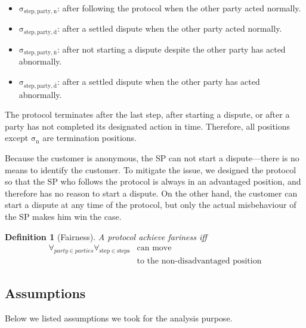 \documentclass{ieeeaccess}
\newtheorem{definition}{Definition}
\begin{document}
\begin{itemize}

\item
  $\mathrm{\sigma_{step,party,n}}$: after following the protocol when the other party acted normally.
\item
  $\mathrm{\sigma_{step,party,d}}$: after a settled dispute when the other party acted normally.
\item
  $\mathrm{\sigma_{step,party,\overline{n}}}$: after not starting a dispute despite the other party has acted abnormally.
\item
  $\mathrm{\sigma_{step,party,\overline{d}}}$: after a settled dispute when the other party has acted abnormally.
\end{itemize}



The protocol terminates after the last step, after starting a dispute, or after a party has not completed its designated action in time. Therefore, all positions except $\mathrm{\sigma_n}$ are termination positions.

Because the customer is anonymous, the SP can not start a dispute—there is no means to identify the customer. To mitigate the issue, we designed the protocol so that the SP who follows the protocol is always in an advantaged position, and therefore has no reason to start a dispute. On the other hand, the customer can start a dispute at any time of the protocol, but only the actual misbehaviour of the SP makes him win the case.

\begin{definition}[Fairness] \label{def:fairness}
A protocol achieve fariness iff 
\begin{equation*}
\begin{split}
\forall_{party \in parties}\forall_{\mathrm{step} \in \mathrm{steps}} &\operatorname{can\ move}\\
&\operatorname{to\ the\ non-disadvantaged\ position} 
\end{split}
\end{equation*}

\end{definition}


\subsection{Assumptions}\label{sec:assumptions}

Below we listed assumptions we took for the analysis purpose.  
\end{document}
